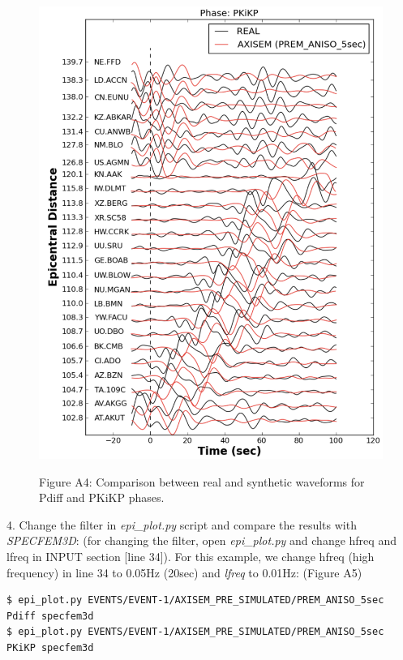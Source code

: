 \documentclass{article}
\begin{document}
\begin{figure}
\begin{minipage}{.5\textwidth}
  \includegraphics[width=1.\linewidth]{AXISEMTutorial-fig009.pdf}
\end{minipage}
\begin{center}
{\small{}Figure A4: Comparison between real and synthetic waveforms for Pdiff and 
PKiKP phases.}
\end{center}
\end{figure}


4. Change the filter in \textit{epi\_plot.py} script and compare the results with 
\textit{SPECFEM3D}: (for changing the filter, open \textit{epi\_plot.py }and change 
hfreq and lfreq in INPUT section [line 34]). For this example, we change hfreq 
(high frequency) in line 34 to 0.05Hz (20sec) and \textit{lfreq }to 0.01Hz: (Figure 
A5)

\begin{lstlisting}
$ epi_plot.py EVENTS/EVENT-1/AXISEM_PRE_SIMULATED/PREM_ANISO_5sec Pdiff specfem3d
$ epi_plot.py EVENTS/EVENT-1/AXISEM_PRE_SIMULATED/PREM_ANISO_5sec PKiKP specfem3d
\end{lstlisting}
\end{document}
